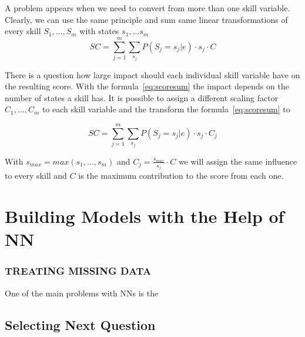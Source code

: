 A problem appears when we need to convert from more than one skill variable. Clearly, we can use the same principle and sum same linear transformations of every skill $S_1,\ldots, S_m$ with states $s_1,\ldots s_m$
\begin{equation}
SC = \sum_{j=1}^m{\sum_{s_j}}{P(S_j=s_j|e)\cdot s_j\cdot C}
\label{eq:scoresum}
\end{equation}

There is a question how large impact should each individual skill variable have on the resulting score. With the formula~\ref{eq:scoresum} the impact depends on the number of states a skill has. It is possible to assign a different scaling factor $C_1,\ldots, C_m$ to each skill variable and the transform the formula~\ref{eq:scoresum} to

\begin{equation}
SC = \sum_{j=1}^m{\sum_{s_j}}{P(S_j=s_j|e)\cdot s_j\cdot C_j} 
\label{eq:scoresum2}
\end{equation}

With $s_{max} = max(s_1,\ldots, s_m)$ and $C_j = \frac{s_{max}}{s_j}\cdot C$ we will assign the same influence to every skill and $C$ is the maximum contribution to the score from each one.

\section{Building Models with the Help of NN}

\subsubsection{TREATING MISSING DATA}
One of the main problems with NNs is the 

\subsection{Selecting Next Question}

